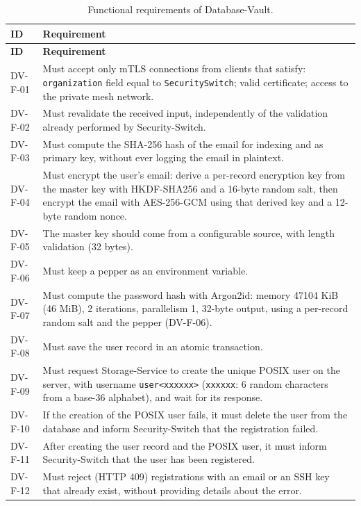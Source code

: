 \begin{longtable}{p{2.6cm} p{\dimexpr\linewidth-2.6cm-4\tabcolsep\relax}}
\caption{Functional requirements of Database-Vault.} \\
\hline
\textbf{ID} & \textbf{Requirement} \\
\hline
\endfirsthead
\hline
\textbf{ID} & \textbf{Requirement} \\
\hline
\endhead
\hline
\endfoot
\hline
\endlastfoot
DV-F-01 & Must accept only mTLS connections from clients that satisfy: \texttt{organization} field equal to \texttt{SecuritySwitch}; valid certificate; access to the private mesh network. \\
DV-F-02 & Must revalidate the received input, independently of the validation already performed by Security-Switch. \\
DV-F-03 & Must compute the SHA-256 hash of the email for indexing and as primary key, without ever logging the email in plaintext. \\
DV-F-04 & Must encrypt the user's email: derive a per-record encryption key from the master key with HKDF-SHA256 and a 16-byte random salt, then encrypt the email with AES-256-GCM using that derived key and a 12-byte random nonce. \\
DV-F-05 & The master key should come from a configurable source, with length validation (32 bytes). \\
DV-F-06 & Must keep a pepper as an environment variable. \\
DV-F-07 & Must compute the password hash with Argon2id: memory 47104 KiB (46 MiB), 2 iterations, parallelism 1, 32-byte output, using a per-record random salt and the pepper (DV-F-06). \\
DV-F-08 & Must save the user record in an atomic transaction. \\
DV-F-09 & Must request Storage-Service to create the unique POSIX user on the server, with username \texttt{user<xxxxxx>} (\texttt{xxxxxx}: 6 random characters from a base-36 alphabet), and wait for its response. \\
DV-F-10 & If the creation of the POSIX user fails, it must delete the user from the database and inform Security-Switch that the registration failed. \\
DV-F-11 & After creating the user record and the POSIX user, it must inform Security-Switch that the user has been registered. \\
DV-F-12 & Must reject (HTTP 409) registrations with an email or an SSH key that already exist, without providing details about the error. \\

\end{longtable}
